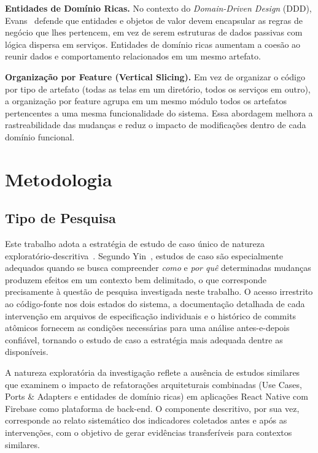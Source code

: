 \documentclass[sigconf,anonymous]{acmart}
\begin{document}
\textbf{Entidades de Domínio Ricas.} No contexto do \textit{Domain-Driven Design} (DDD), Evans~\cite{Evans2003} defende que entidades e objetos de valor devem encapsular as regras de negócio que lhes pertencem, em vez de serem estruturas de dados passivas com lógica dispersa em serviços. Entidades de domínio ricas aumentam a coesão ao reunir dados e comportamento relacionados em um mesmo artefato.

\textbf{Organização por Feature (Vertical Slicing).} Em vez de organizar o código por tipo de artefato (todas as telas em um diretório, todos os serviços em outro), a organização por feature agrupa em um mesmo módulo todos os artefatos pertencentes a uma mesma funcionalidade do sistema. Essa abordagem melhora a rastreabilidade das mudanças e reduz o impacto de modificações dentro de cada domínio funcional.


\section{Metodologia}

\subsection{Tipo de Pesquisa}

Este trabalho adota a estratégia de estudo de caso único de natureza exploratório-descritiva~\cite{Yin2014}. Segundo Yin~\cite{Yin2014}, estudos de caso são especialmente adequados quando se busca compreender \textit{como} e \textit{por quê} determinadas mudanças produzem efeitos em um contexto bem delimitado, o que corresponde precisamente à questão de pesquisa investigada neste trabalho. O acesso irrestrito ao código-fonte nos dois estados do sistema, a documentação detalhada de cada intervenção em arquivos de especificação individuais e o histórico de commits atômicos fornecem as condições necessárias para uma análise antes-e-depois confiável, tornando o estudo de caso a estratégia mais adequada dentre as disponíveis.

A natureza exploratória da investigação reflete a ausência de estudos similares que examinem o impacto de refatorações arquiteturais combinadas (Use Cases, Ports \& Adapters e entidades de domínio ricas) em aplicações React Native com Firebase como plataforma de back-end. O componente descritivo, por sua vez, corresponde ao relato sistemático dos indicadores coletados antes e após as intervenções, com o objetivo de gerar evidências transferíveis para contextos similares.
\end{document}
